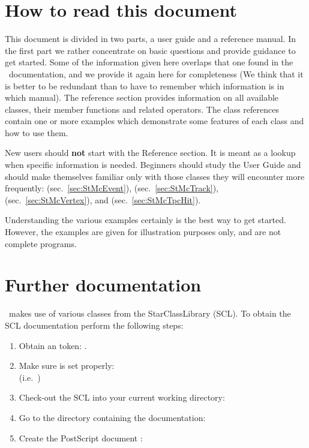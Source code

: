 
\section{How to read this document}

This document is divided in two parts, a user guide and a
reference manual. In the first part we rather concentrate on basic
questions and provide guidance to get started.  Some of the information
given here overlaps that one found in the \StEvent\ documentation,
and we provide it again here for completeness (We think that it is better
to be redundant than to have to remember which information is in which
manual).  The reference section
provides information on all available classes, their member functions
and related operators. The class references contain one or more
examples which demonstrate some features of each class and how to use
them.

New users should \textbf{not} start with the Reference section. It is
meant as a lookup when specific information is needed. Beginners
should study the User Guide and should make themselves familiar only
with those classes they will encounter more frequently:
  (sec.~\ref{sec:StMcEvent}),
  (sec.~\ref{sec:StMcTrack}),
 (sec.~\ref{sec:StMcVertex}),
and  (sec.~\ref{sec:StMcTpcHit}).



Understanding the various
examples certainly is the best way to get started. However, the examples
are given for illustration purposes only, and are not complete programs.


\section{Further documentation}
\label{sec:furtherdoc}

\StMcEvent\ makes use of various classes from the StarClassLibrary (SCL).
To obtain the SCL documentation perform the following steps:
\begin{enumerate}
  \item Obtain an  token: .
  \item Make sure  is set properly: \\ %
	(i.e.~)
  \item Check-out the SCL into your current working directory:\\
  \item Go to the directory containing the documentation:\\
  \item Create the PostScript document :\\
\end{enumerate}
 

